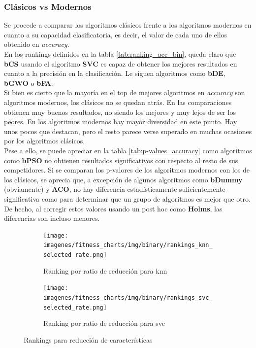 \subsubsection{Clásicos vs Modernos}
Se procede a comparar los algoritmos clásicos frente a los algoritmos modernos en cuanto a su capacidad clasificatoria, es decir, el valor de cada uno de ellos obtenido en \textit{accuracy}.\\[6pt]

En los rankings definidos en la tabla \ref{tab:ranking_acc_bin}, queda claro que \textbf{bCS} usando el algoritmo \textbf{SVC} es capaz de obtener los mejores resultados en cuanto a la precisión en la clasificación. Le siguen algoritmos como \textbf{bDE}, \textbf{bGWO} o \textbf{bFA}.\\[6pt]

Si bien es cierto que la mayoría en el top de mejores algoritmos en \textit{accuracy} son algoritmos modernos, los clásicos no se quedan atrás. En las comparaciones obtienen muy buenos resultados, no siendo los mejores y muy lejos de ser los peores. En los algoritmos modernos hay mayor diversidad en este punto. Hay unos pocos que destacan, pero el resto parece verse superado en muchas ocasiones por los algoritmos clásicos.\\[6pt]

Pese a ello, se puede apreciar en la tabla \ref{tab:p-values_accuracy} como algoritmos como \textbf{bPSO} no obtienen resultados significativos con respecto al resto de sus competidores. Si se comparan los p-valores de los algoritmos modernos con los de los clásicos, se aprecia que, a excepción de algunos algoritmos como \textbf{bDummy} (obviamente) y \textbf{ACO}, no hay diferencia estadísticamente suficientemente significativa como para determinar que un grupo de algoritmos es mejor que otro. De hecho, al corregir estos valores usando un post hoc como \textbf{Holms}, las diferencias son incluso menores.\\[6pt]

\begin{figure}[htb]
    \centering
    \begin{subfigure}[b]{1\textwidth}
        \texttt{[image: imagenes/fitness\_charts/img/binary/rankings\_knn\_selected\_rate.png]}
        \caption{Ranking por ratio de reducción para knn}
        \label{fig:ranking_knn_red}
    \end{subfigure}
    \begin{subfigure}[b]{1\textwidth}
        \texttt{[image: imagenes/fitness\_charts/img/binary/rankings\_svc\_selected\_rate.png]}
        \caption{Ranking por ratio de reducción para svc}
        \label{fig:ranking_svc_red}
    \end{subfigure}
    \caption{Rankings para reducción de características}
    \label{fig:rankings_red}
\end{figure}

